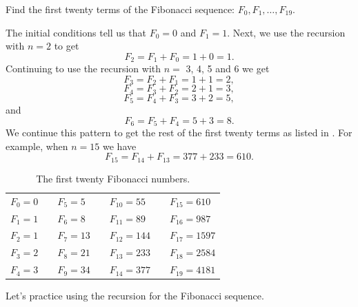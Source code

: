 \begin{exam}
\label{exam_fib_list}
    Find the first twenty terms of the Fibonacci sequence: $F_0, F_1, \ldots, F_{19}$.
        \begin{soln}
            The initial conditions tell us that $F_0=0$ and $F_1=1$. Next, we use the recursion with $n=2$ to get $$F_2=F_1+F_0 = 1+0=1.$$
            Continuing to use the recursion with $n=$ 3, 4, 5 and 6 we get
            $$F_3=F_2+F_1 = 1+1=2,$$
            $$F_4=F_3+F_2 = 2+1=3,$$
            $$F_5=F_4+F_3 = 3+2=5,$$ and
            $$F_6=F_5+F_4 = 5+3=8.$$
            We continue this pattern to get the rest of the first twenty terms as listed in .  For example, when $n=15$ we have
            $$F_{15}=F_{14}+F_{13} = 377+233=610.$$
        \end{soln}
        \begin{table}[hbtp]
            \centering
            \begin{tabular}{ll ll ll l}
                $F_0=0$ & \hspace{.5in} & $F_5=5$ & \hspace{.5in} & $F_{10}=55$ & \hspace{.5in} & $F_{15}=610$\\
                $F_1=1$ && $F_6=8$ && $F_{11}=89$ && $F_{16}=987$ \\
                $F_2=1$ && $F_7=13$ && $F_{12}=144$ && $F_{17}=1597$\\
                $F_3=2$ && $F_8=21$ && $F_{13}=233$ && $F_{18}=2584$\\
                $F_4=3$ && $F_9=34$ && $F_{14}=377$ && $F_{19}=4181$\\
            \end{tabular}
            \caption{The first twenty Fibonacci numbers.}
            \label{table_first20_fib}
        \end{table}
\end{exam}

Let's practice using the recursion for the Fibonacci sequence.

